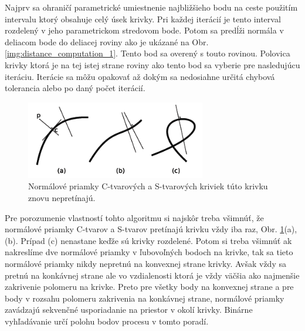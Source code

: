 Najprv sa ohraničí parametrické umiestnenie najbližšieho bodu na ceste použitím intervalu ktorý obsahuje celý úsek krivky. Pri každej iterácií je tento interval rozdelený v jeho parametrickom stredovom bode. Potom sa predĺži normála v deliacom bode do deliacej roviny ako je ukázané na Obr. \ref{img:distance_computation_1}. Tento bod sa overený s touto rovinou. Polovica krivky ktorá je na tej istej strane roviny ako tento bod sa vyberie pre nasledujúcu iteráciu. Iterácie sa môžu opakovať až dokým sa nedosiahne určitá chybová tolerancia alebo po daný počet iterácií.
\begin{figure}[H]
\begin{center}
\includegraphics[width=0.7\textwidth]{images/distance_computation_2}
\caption{Normálové priamky C-tvarových a S-tvarových kriviek túto krivku znovu nepretínajú. \cite{qmk08}}
\label{img:distance_computation_2}
\end{center}
\end{figure}

Pre porozumenie vlastností tohto algoritmu si najskôr treba všimnúť, že normálové priamky C-tvarov a S-tvarov pretínajú krivku vždy iba raz, Obr. \ref{img:distance_computation_2}(a),(b). Prípad (c) nenastane keďže sú krivky rozdelené. Potom si treba všimnúť ak nakreslíme dve normálové priamky v ľubovoľných bodoch na krivke, tak sa tieto normálové priamky nikdy nepretnú na konvexnej strane krivky. Avšak vždy sa pretnú na konkávnej strane ale vo vzdialenosti ktorá je vždy väčšia ako najmenšie zakrivenie polomeru na krivke. Preto pre všetky body na konvexnej strane a pre body v rozsahu polomeru zakrivenia na konkávnej strane, normálové priamky zavádzajú sekvenčné usporiadanie na priestor v okolí krivky. Binárne vyhľadávanie určí polohu bodov procesu v tomto poradí.
